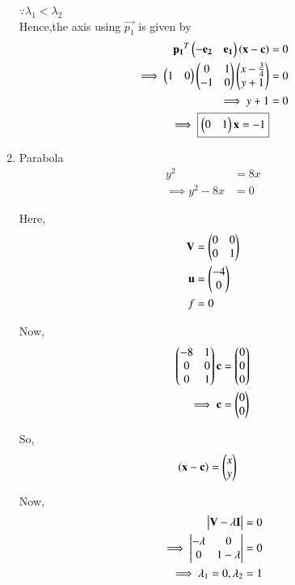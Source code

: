 \begin{enumerate}
    $\because \lambda_1<\lambda_2$ \\
    Hence,the axis using $\vec{p_1}$ is given by
    \begin{align}
        \mathbf{p_1}^T\begin{pmatrix}-\mathbf{e_2} & \mathbf{e_1}\end{pmatrix}\left(\mathbf{x}-\mathbf{c}\right) &= 0 \\
        \implies \begin{pmatrix}1 & 0\end{pmatrix}\begin{pmatrix}0 & 1 \\ -1 & 0\end{pmatrix}\begin{pmatrix}x-\frac{3}{4} \\ y+1\end{pmatrix} &= 0 \\
        \implies y+1 &= 0 \\
        \implies \boxed{\begin{pmatrix}0 & 1\end{pmatrix}\mathbf{x} =-1}
    \end{align}

    \item Parabola
    \begin{align}
        y^2 &= 8x
        \\
        \implies y^2-8x &= 0
    \end{align}
    
    Here,
    \begin{align}
    \mathbf{V} &= \begin{pmatrix}0 & 0 \\ 0 & 1\end{pmatrix} \\
    \mathbf{u} &= \begin{pmatrix}-4 \\ 0\end{pmatrix} \\
    f &= 0
    \end{align}

    Now,
    \begin{align}
    \begin{pmatrix}-8 & 1 \\ 0 & 0 \\ 0 & 1\end{pmatrix}\mathbf{c} &= \begin{pmatrix}0 \\ 0 \\ 0\end{pmatrix}
    \\
    \implies \mathbf{c} &= \begin{pmatrix}0 \\ 0\end{pmatrix}
    \end{align}
    
    So,
    \begin{align}
    \left(\mathbf{x}-\mathbf{c}\right) &= \begin{pmatrix}x \\ y\end{pmatrix}
    \end{align}
    
    Now,
    \begin{align}
        \begin{vmatrix}\mathbf{V}-\lambda\mathbf{I}\end{vmatrix} &= 0 \\
        \implies \begin{vmatrix}-\lambda & 0 \\ 0 & 1-\lambda\end{vmatrix} &= 0 \\
        \implies \lambda_1 =0,\lambda_2 &= 1
    \end{align}
    

\end{enumerate}
